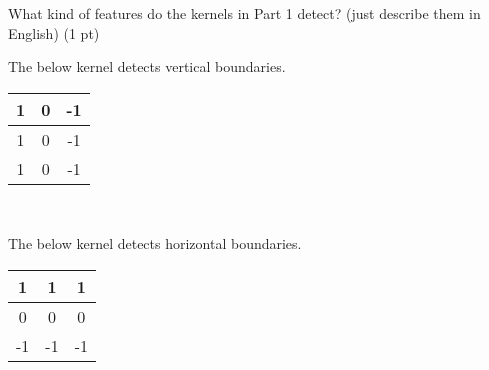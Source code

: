 What kind of features do the kernels in Part 1 detect? (just describe them in English) (1 pt)

\begin{tcolorbox}[title=Solution]
	The below kernel detects vertical boundaries.
	\begin{center}
		\begin{tabular}{|c|c|c|}
			\hline
			1 & 0 & -1 \\ \hline
			1 & 0 & -1 \\ \hline
			1 & 0 & -1 \\ \hline
		\end{tabular} \\
	\end{center}
	The below kernel detects horizontal boundaries.
	\begin{center}
		\begin{tabular}{|c|c|c|}
			\hline
			1  & 1  & 1  \\ \hline
			0  & 0  & 0  \\ \hline
			-1 & -1 & -1 \\ \hline
		\end{tabular}
	\end{center}
\end{tcolorbox}

